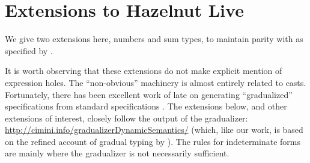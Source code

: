 \clearpage
\newcommand{\extensionsSec}{Extensions to Hazelnut Live}
\section{\protect\extensionsSec} %
\label{sec:extensions}

We give two extensions here, numbers and sum types, to maintain parity with \Hazelnut as specified by \citet{popl-paper}.

It is worth observing that these extensions do not make explicit mention of expression holes. The ``non-obvious'' machinery is almost entirely related to casts. Fortunately, there has been excellent work of late on generating ``gradualized'' specifications from standard specifications \cite{DBLP:conf/popl/CiminiS16}. The extensions below, and other extensions of interest, closely follow the output of the gradualizer: \url{http://cimini.info/gradualizerDynamicSemantics/} (which, like our work, is based on the refined account of gradual typing by \cite{DBLP:conf/snapl/SiekVCB15}). The rules for indeterminate forms are mainly where the gradualizer is not necessarily sufficient.


%




